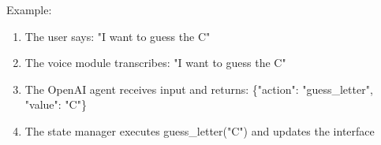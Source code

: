 Example:
\begin{enumerate}
    \item The user says: "I want to guess the C"
    \item The voice module transcribes: "I want to guess the C"
    \item The OpenAI agent receives input and returns: \{"action": "guess\_letter", "value": "C"\}
    \item The state manager executes guess\_letter("C") and updates the interface
\end{enumerate}





